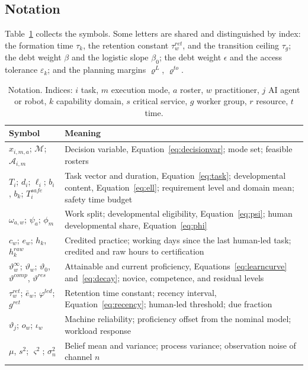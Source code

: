 \documentclass[utf8]{frontiers_suppmat}
\begin{document}
\subsection{Notation}
\label{app:proofs-notation}

Table~\ref{tab:notation} collects the symbols. Some letters are shared and distinguished by index: the formation time $\tau_k$, the retention constant $\tau^{ret}_w$, and the transition ceiling $\tau_g$; the debt weight $\beta$ and the logistic slope $\beta_0$; the debt weight $\epsilon$ and the access tolerance $\varepsilon_k$; and the planning margins $\varrho^{L}$, $\varrho^{to}$.

\begin{table}[!htbp]
	\caption{Notation. Indices: $i$ task, $m$ execution mode, $a$ roster, $w$ practitioner, $j$ AI agent or robot, $k$ capability domain, $s$ critical service, $g$ worker group, $r$ resource, $t$ time.}
	\label{tab:notation}
	\footnotesize
	\begin{tabularx}{\textwidth}{lX}
		\toprule
		\textbf{Symbol} & \textbf{Meaning}\\
		\midrule
		$x_{i,m,a}$; $\mathcal{M}$; $\mathcal{A}_{i,m}$ & Decision variable, Equation~\eqref{eq:decisionvar}; mode set; feasible rosters\\
		$T_i$; $d_i$; $\ell_i$; $b_i$, $b_k$; $T^{safe}_i$ & Task vector and duration, Equation~\eqref{eq:task}; developmental content, Equation~\eqref{eq:ell}; requirement level and domain mean; safety time budget\\
		$\omega_{a,w}$; $\psi_a$; $\phi_m$ & Work split; developmental eligibility, Equation~\eqref{eq:psi}; human developmental share, Equation~\eqref{eq:phi}\\
		$c_w$; $e_w$; $h_k$, $h^{raw}_k$ & Credited practice; working days since the last human-led task; credited and raw hours to certification\\
		$\vartheta^{\infty}_w$; $\vartheta_w$; $\vartheta_0$, $\vartheta^{comp}$, $\vartheta^{res}$ & Attainable and current proficiency, Equations~\eqref{eq:learncurve} and~\eqref{eq:decay}; novice, competence, and residual levels\\
		$\tau^{ret}_w$; $\bar e_w$; $\varphi^{led}$; $g^{ret}$ & Retention time constant; recency interval, Equation~\eqref{eq:recency}; human-led threshold; due fraction\\
		$\vartheta_j$; $o_w$; $\iota_w$ & Machine reliability; proficiency offset from the nominal model; workload response\\
		$\mu$, $s^2$; $\varsigma^2$; $\sigma_n^2$ & Belief mean and variance; process variance; observation noise of channel $n$\\

\end{tabularx}
\end{table}
\end{document}
